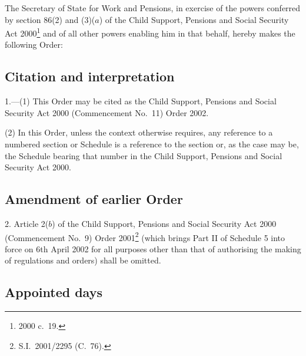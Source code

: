 \documentclass[12pt,a4paper]{article}
\title{\regstitle}
\author{S.I.\ 2002 No.\ 437 (C.\ 12)}
\date{Made
27th February 2002\\
}
\begin{document}
\maketitle

\noindent
The Secretary of State for Work and Pensions, in exercise of the powers conferred by section 86(2) and (3)($a$)  of the Child Support, Pensions and Social Security Act 2000\footnote{2000 c.\ 19.} and of all other powers enabling him in that behalf, hereby makes the following Order:  

{\sloppy

\tableofcontents

}

\bigskip

\setcounter{secnumdepth}{-2}

\subsection[1. Citation and interpretation]{Citation and interpretation}

1.---(1)  This Order may be cited as the Child Support, Pensions and Social Security Act 2000 (Commencement No.\ 11) Order 2002.

(2) In this Order, unless the context otherwise requires, any reference to a numbered section or Schedule is a reference to the section or, as the case may be, the Schedule bearing that number in the Child Support, Pensions and Social Security Act 2000.

\subsection[2. Amendment of earlier Order]{Amendment of earlier Order}

2.  Article 2($b$)  of the Child Support, Pensions and Social Security Act 2000 (Commencement No.\ 9) Order 2001\footnote{S.I.\ 2001/2295 (C.\ 76).} (which brings Part II of Schedule 5 into force on 6th April 2002 for all purposes other than that of authorising the making of regulations and orders) shall be omitted.

\subsection[3. Appointed days]{Appointed days}
\end{document}
